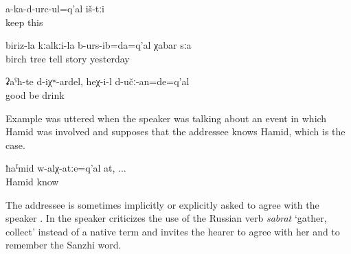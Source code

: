 \begin{exe}
	\ex	\label{ex:These (pictures) do not fit (on the table or in that order) minor}
	\gll	a-ka-d-urc-ul=q'al	iš-tːi\\
		keep	this\\
	\glt	{}

	\ex	\label{ex:Yesterday I already told the story about the birch tree minor}
	\gll	biriz-la	kːalkːi-la	b-urs-ib=da=q'al	χabar	sːa\\
		birch	tree	tell	story	yesterday\\
	\glt	{}

	\ex	\label{ex:If (the drinks) would be good, he would drink them minor}
	\gll	ʡaˁħ-te	d-iχʷ-ardel,	heχ-i-l	d-učː-an=de=q'al\\
		good 	be	 drink\\
	\glt	{}
\end{exe}

Example  was uttered when the speaker was talking about an event in which Hamid was involved and supposes that the addressee knows Hamid, which is the case.\largerpage[2]

\begin{exe}
	\ex	\label{ex:Hamid, if you know him minor}
	\gll	ħaˁmid	w-alχ-atːe=q'al	at, ...\\
		Hamid	know	\\
	\glt	{}
\end{exe}

The addressee is sometimes implicitly or explicitly asked to agree with the speaker . In  the speaker criticizes the use of the Russian verb \textit{sabrat} `gather, collect' instead of a native term and invites the hearer to agree with her and to remember the Sanzhi word.

